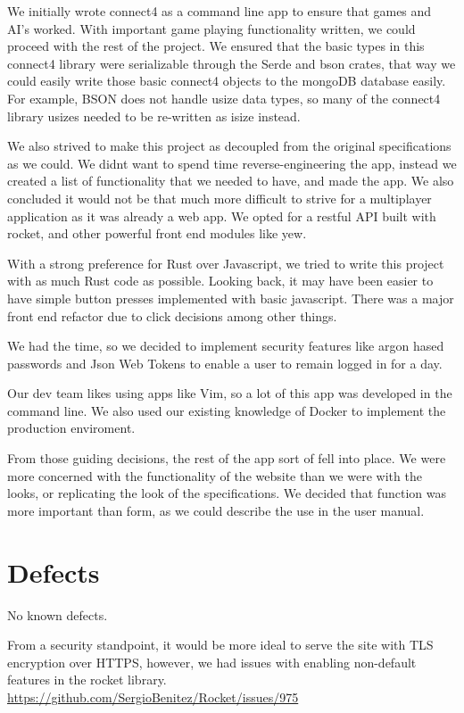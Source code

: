 \documentclass[letterpaper]{article}
\begin{document}
We initially wrote connect4 as a command line app to ensure that games and AI's worked. With important game playing functionality written, we could proceed with the rest of the project. We ensured that the basic types in this connect4 library were serializable through the Serde and bson crates, that way we could easily write those basic connect4 objects to the mongoDB database easily. For example, BSON does not handle usize data types, so many of the connect4 library usizes needed to be re-written as isize instead.

We also strived to make this project as decoupled from the original specifications as we could. We didnt want to spend time reverse-engineering the app, instead we created a list of functionality that we needed to have, and made the app. We also concluded it would not be that much more difficult to strive for a multiplayer application as it was already a web app. We opted for a restful API built with rocket, and other powerful front end modules like yew.

With a strong preference for Rust over Javascript, we tried to write this project with as much Rust code as possible. Looking back, it may have been easier to have simple button presses implemented with basic javascript. There was a major front end refactor due to click decisions among other things.

We had the time, so we decided to implement security features like argon hased passwords and Json Web Tokens to enable a user to remain logged in for a day.


Our dev team likes using apps like Vim, so a lot of this app was developed in the command line. We also used our existing knowledge of Docker to implement the production enviroment.


From those guiding decisions, the rest of the app sort of fell into place. We were more concerned with the functionality of the website than we were with the looks, or replicating the look of the specifications. We decided that function was more important than form, as we could describe the use in the user manual.

\section{Defects}
No known defects.

From a security standpoint, it would be more ideal to serve the site with TLS encryption over HTTPS,
however, we had issues with enabling non-default features in the rocket library.
\url{https://github.com/SergioBenitez/Rocket/issues/975}
\end{document}
